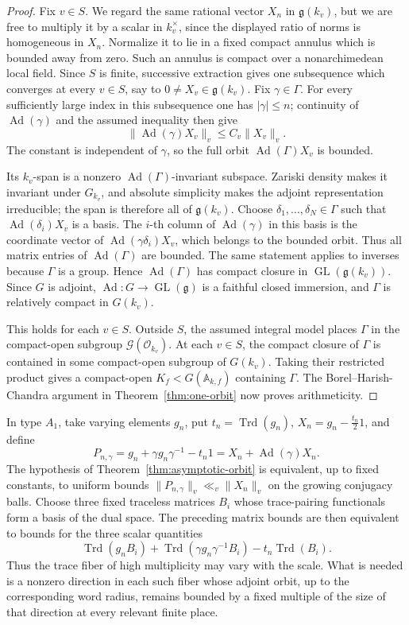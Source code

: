 \documentclass[11pt,reqno]{amsart}
\theoremstyle{definition}
\theoremstyle{remark}
\newcommand{\cO}{\mathcal O}
\newcommand{\Trd}{\operatorname{Trd}}
\newcommand{\GL}{\operatorname{GL}}
\newcommand{\Ad}{\operatorname{Ad}}
\begin{document}
\begin{proof}
Fix \(v\in S\).  We regard the same rational vector \(X_n\) in
\(\mathfrak g(k_v)\), but we are free to multiply it by a scalar in
\(k_v^\times\), since the displayed ratio of norms is homogeneous in
\(X_n\).  Normalize it to lie in a fixed compact annulus which is bounded
away from zero.  Such an annulus is compact over a nonarchimedean local
field.  Since \(S\) is finite, successive extraction gives one subsequence
which converges at every \(v\in S\), say to
\(0\ne X_v\in\mathfrak g(k_v)\).  Fix \(\gamma\in\Gamma\).  For every
sufficiently large index in this subsequence one has \(|\gamma|\le n\);
continuity of \(\Ad(\gamma)\) and the assumed inequality then give
\[
 \|\Ad(\gamma)X_v\|_v\le C_v\|X_v\|_v.
\]
The constant is independent of \(\gamma\), so the full orbit
\(\Ad(\Gamma)X_v\) is bounded.

Its \(k_v\)-span is a nonzero \(\Ad(\Gamma)\)-invariant subspace.  Zariski
density makes it invariant under \(G_{k_v}\), and absolute simplicity makes
the adjoint representation irreducible; the span is therefore all of
\(\mathfrak g(k_v)\).  Choose
\(\delta_1,\ldots,\delta_N\in\Gamma\) such that
\(\Ad(\delta_i)X_v\) is a basis.  The \(i\)-th column of
\(\Ad(\gamma)\) in this basis is the coordinate vector of
\(\Ad(\gamma\delta_i)X_v\), which belongs to the bounded orbit.  Thus all
matrix entries of \(\Ad(\Gamma)\) are bounded.  The same statement applies
to inverses because \(\Gamma\) is a group.  Hence
\(\Ad(\Gamma)\) has compact closure in \(\GL(\mathfrak g(k_v))\).
Since \(G\) is adjoint, \(\Ad:G\to\GL(\mathfrak g)\) is a faithful closed
immersion, and \(\Gamma\) is relatively compact in \(G(k_v)\).

This holds for each \(v\in S\).  Outside \(S\), the assumed integral model
places \(\Gamma\) in the compact-open subgroup
\(\mathcal G(\cO_{k_v})\).  At each \(v\in S\), the compact closure of
\(\Gamma\) is contained in some compact-open subgroup of \(G(k_v)\).
Taking their restricted product gives a compact-open
\(K_f<G(\mathbb A_{k,f})\) containing \(\Gamma\).  The
Borel--Harish-Chandra argument in Theorem~\ref{thm:one-orbit} now proves
arithmeticity.
\end{proof}

In type \(A_1\), take varying elements \(g_n\), put
\(t_n=\Trd(g_n)\), \(X_n=g_n-\frac{t_n}{2}1\), and define
\[
 P_{n,\gamma}=g_n+\gamma g_n\gamma^{-1}-t_n1
              =X_n+\Ad(\gamma)X_n.
\]
The hypothesis of Theorem~\ref{thm:asymptotic-orbit} is equivalent, up to
fixed constants, to uniform bounds
\(\|P_{n,\gamma}\|_v\ll_v\|X_n\|_v\) on the growing conjugacy balls.  Choose
three fixed traceless matrices \(B_i\) whose trace-pairing functionals form
a basis of the dual space.  The preceding matrix bounds are then equivalent
to bounds for the three scalar quantities
\[
 \Trd(g_nB_i)+\Trd(\gamma g_n\gamma^{-1}B_i)
       -t_n\Trd(B_i).
\]
Thus the trace fiber of high multiplicity may vary with the scale.  What is
needed is a nonzero direction in each such fiber whose adjoint orbit, up to
the corresponding word radius, remains bounded by a fixed multiple of the
size of that direction at every relevant finite place.
\end{document}
